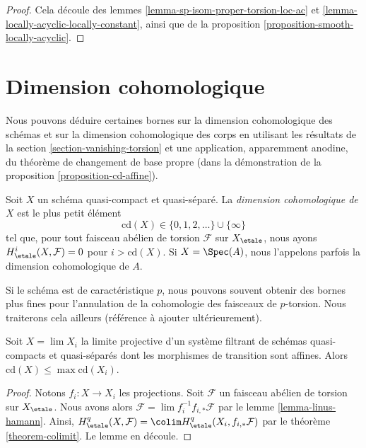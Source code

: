 \begin{proof}
Cela découle des lemmes \ref{lemma-sp-isom-proper-torsion-loc-ac}
et \ref{lemma-locally-acyclic-locally-constant}, ainsi que de la
proposition \ref{proposition-smooth-locally-acyclic}.
\end{proof}

















\section{Dimension cohomologique}
\label{section-cd}

\noindent
Nous pouvons déduire certaines bornes sur la dimension cohomologique des
schémas et sur la dimension cohomologique des corps en utilisant
les résultats de la section \ref{section-vanishing-torsion}
et une application, apparemment anodine, du théorème de changement
de base propre (dans la démonstration de la proposition \ref{proposition-cd-affine}).

\begin{definition}
\label{definition-cd}
Soit $X$ un schéma quasi-compact et quasi-séparé.
La {\it dimension cohomologique de $X$} est le plus petit
élément
$$
\text{cd}(X) \in \{0, 1, 2, \ldots\} \cup \{\infty\}
$$
tel que, pour tout faisceau abélien de torsion $\mathcal{F}$
sur $X_\etale$, nous ayons $H^i_\etale(X, \mathcal{F}) = 0$
pour $i > \text{cd}(X)$. Si $X = \Spec(A)$, nous l'appelons parfois
la dimension cohomologique de $A$.
\end{definition}

\noindent
Si le schéma est de caractéristique $p$, nous pouvons souvent
obtenir des bornes plus fines pour l'annulation de la cohomologie des
faisceaux de $p$-torsion. Nous traiterons cela ailleurs
(référence à ajouter ultérieurement).

\begin{lemma}
\label{lemma-cd-limit}
Soit $X = \lim X_i$ la limite projective d'un système filtrant de
schémas quasi-compacts et quasi-séparés dont les morphismes de
transition sont affines. Alors $\text{cd}(X) \leq \max \text{cd}(X_i)$.
\end{lemma}

\begin{proof}
Notons $f_i : X \to X_i$ les projections.
Soit $\mathcal{F}$ un faisceau abélien de torsion sur $X_\etale$.
Nous avons alors $\mathcal{F} = \lim f_i^{-1}f_{i, *}\mathcal{F}$
par le lemme \ref{lemma-linus-hamann}.
Ainsi, $H^q_\etale(X, \mathcal{F}) =
\colim H^q_\etale(X_i, f_{i, *}\mathcal{F})$
par le théorème \ref{theorem-colimit}.
Le lemme en découle.
\end{proof}

